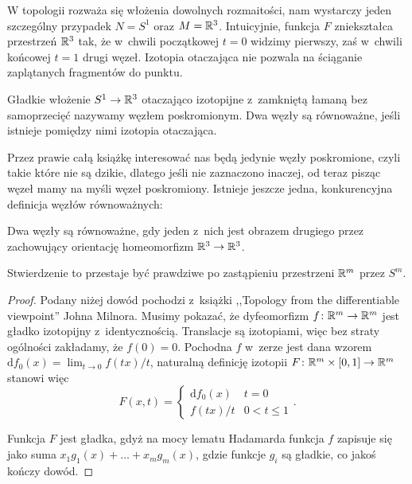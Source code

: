 W topologii rozważa się włożenia dowolnych rozmaitości, nam wystarczy jeden szczególny przypadek $N = S^1$ oraz $M = \mathbb R^3$.
Intuicyjnie, funkcja $F$ zniekształca przestrzeń $\mathbb R^3$ tak, że w~chwili początkowej $t = 0$ widzimy pierwszy, zaś w~chwili końcowej $t = 1$ drugi węzeł.
Izotopia otaczająca nie pozwala na ściąganie zaplątanych fragmentów do punktu.


\begin{definition}[węzeł]
    \label{def:knot}
    Gładkie włożenie $S^1 \to \mathbb R^3$ otaczająco izotopijne z~zamkniętą łamaną bez samoprzecięć nazywamy węzłem poskromionym.
    Dwa węzły są równoważne, jeśli istnieje pomiędzy nimi izotopia otaczająca.
\end{definition}

Przez prawie całą książkę interesować nas będą jedynie węzły poskromione, czyli takie które nie są dzikie,
dlatego jeśli nie zaznaczono inaczej, od teraz pisząc węzeł mamy na myśli węzeł poskromiony.
Istnieje jeszcze jedna, konkurencyjna definicja węzłów równoważnych:

\begin{proposition}
    \label{def:equivalent_knots_2}
    Dwa węzły są równoważne, gdy jeden z~nich jest obrazem drugiego przez zachowujący orientację homeomorfizm $\mathbb R^3 \to \mathbb R^3$.
\end{proposition}

Stwierdzenie to przestaje być prawdziwe po zastąpieniu przestrzeni $\mathbb R^m$ przez $S^m$.

\begin{proof}
    Podany niżej dowód pochodzi z~książki ,,Topology from the differentiable viewpoint'' Johna Milnora.
    Musimy pokazać, że dyfeomorfizm $f \colon \mathbb R^m \to \mathbb R^m$ jest gładko izotopijny z~identycznością.
    Translacje są izotopiami, więc bez straty ogólności zakładamy, że $f(0) = 0$.
    Pochodna $f$ w~zerze jest dana wzorem $\mathrm{d}f_0(x) = \lim_{t \to 0} f(tx) /t$,
    naturalną definicję izotopii $F \colon \mathbb R^m \times [0, 1] \to \mathbb R^m$ stanowi więc
    \[
        F(x, t) = \begin{cases}
            \mathrm{d}f_0(x) & t = 0 \\
            f(tx) / t & 0 < t \le 1
        \end{cases} .
    \]

    Funkcja $F$ jest gładka, gdyż na mocy lematu Hadamarda funkcja $f$ zapisuje się jako suma $x_1 g_1(x) + \ldots + x_mg_m(x)$, gdzie funkcje $g_i$ są gładkie, co jakoś kończy dowód.
\end{proof}


